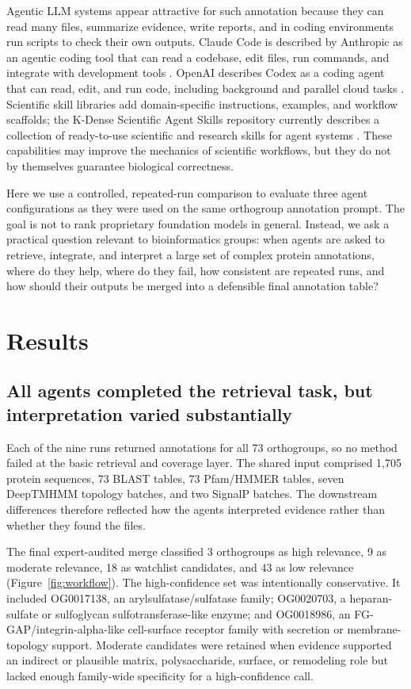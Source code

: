 \documentclass[11pt]{article}
\begin{document}
Agentic LLM systems appear attractive for such annotation because they can read many files, summarize evidence, write reports, and in coding environments run scripts to check their own outputs. Claude Code is described by Anthropic as an agentic coding tool that can read a codebase, edit files, run commands, and integrate with development tools \citep{AnthropicClaudeCode2026}. OpenAI describes Codex as a coding agent that can read, edit, and run code, including background and parallel cloud tasks \citep{OpenAICodex2026}. Scientific skill libraries add domain-specific instructions, examples, and workflow scaffolds; the K-Dense Scientific Agent Skills repository currently describes a collection of ready-to-use scientific and research skills for agent systems \citep{KDenseSkills2026}. These capabilities may improve the mechanics of scientific workflows, but they do not by themselves guarantee biological correctness.

Here we use a controlled, repeated-run comparison to evaluate three agent configurations as they were used on the same orthogroup annotation prompt. The goal is not to rank proprietary foundation models in general. Instead, we ask a practical question relevant to bioinformatics groups: when agents are asked to retrieve, integrate, and interpret a large set of complex protein annotations, where do they help, where do they fail, how consistent are repeated runs, and how should their outputs be merged into a defensible final annotation table?

\section{Results}

\subsection{All agents completed the retrieval task, but interpretation varied substantially}

Each of the nine runs returned annotations for all 73 orthogroups, so no method failed at the basic retrieval and coverage layer. The shared input comprised 1,705 protein sequences, 73 BLAST tables, 73 Pfam/HMMER tables, seven DeepTMHMM topology batches, and two SignalP batches. The downstream differences therefore reflected how the agents interpreted evidence rather than whether they found the files.

The final expert-audited merge classified 3 orthogroups as high relevance, 9 as moderate relevance, 18 as watchlist candidates, and 43 as low relevance (Figure~\ref{fig:workflow}). The high-confidence set was intentionally conservative. It included OG0017138, an arylsulfatase/sulfatase family; OG0020703, a heparan-sulfate or sulfoglycan sulfotransferase-like enzyme; and OG0018986, an FG-GAP/integrin-alpha-like cell-surface receptor family with secretion or membrane-topology support. Moderate candidates were retained when evidence supported an indirect or plausible matrix, polysaccharide, surface, or remodeling role but lacked enough family-wide specificity for a high-confidence call.
\end{document}
